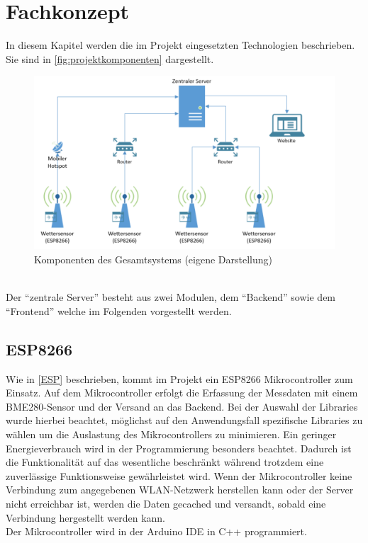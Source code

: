 

\section{Fachkonzept}
In diesem Kapitel werden die im Projekt eingesetzten Technologien beschrieben. Sie sind in \autoref{fig:projektkomponenten} dargestellt. \\
\begin{figure}[h]
    \centering
    \includegraphics[width=0.7\linewidth]{img/projektkomponenten}
    \caption[Komponenten des Gesamtsystems]{Komponenten des Gesamtsystems (eigene Darstellung)}
    \label{fig:projektkomponenten}
\end{figure}
\\
Der \enquote{zentrale Server} besteht aus zwei Modulen, dem \enquote{Backend} sowie dem \enquote{Frontend} welche im Folgenden vorgestellt werden.

\subsection{ESP8266}
Wie in \autoref{ESP} beschrieben, kommt im Projekt ein ESP8266 Mikrocontroller zum Einsatz.
Auf dem Mikrocontroller erfolgt die Erfassung der Messdaten mit einem BME280-Sensor und der Versand an das Backend.
Bei der Auswahl der Libraries wurde hierbei beachtet, möglichst auf den Anwendungsfall spezifische Libraries zu wählen um die Auslastung des Mikrocontrollers zu minimieren.
Ein geringer Energieverbrauch wird in der Programmierung besonders beachtet.
Dadurch ist die Funktionalität auf das wesentliche beschränkt während trotzdem eine zuverlässige Funktionsweise gewährleistet wird.
Wenn der Mikrocontroller keine Verbindung zum angegebenen WLAN-Netzwerk herstellen kann oder der Server nicht erreichbar ist, werden die Daten gecached und versandt, sobald eine Verbindung hergestellt werden kann.\\
Der Mikrocontroller wird in der Arduino IDE in C++ programmiert.

